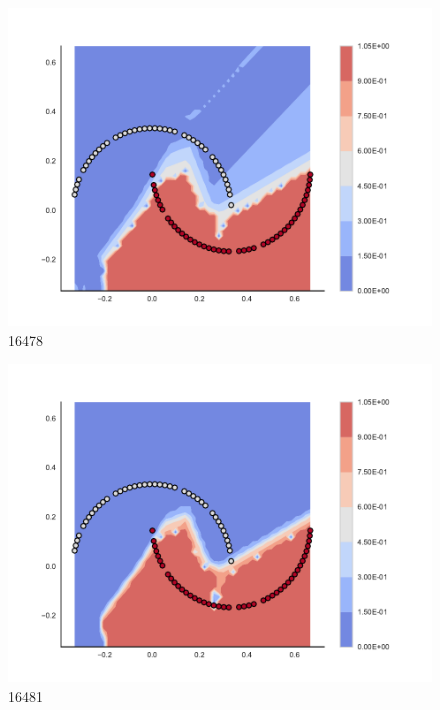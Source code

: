 \begin{subfigure}[b]{0.09\textwidth}
    \includegraphics[clip, trim=2.35cm 1.75cm 4.5cm 0cm,width=\textwidth]{img/convergence/16478.pdf}
    \caption{16478}
    \label{fig:convergence_16478}
\end{subfigure}
%
\begin{subfigure}[b]{0.09\textwidth}
    \includegraphics[clip, trim=2.35cm 1.75cm 4.5cm 0cm,width=\textwidth]{img/convergence/16481.pdf}
    \caption{16481}
    \label{fig:convergence_16481}
\end{subfigure}
%
